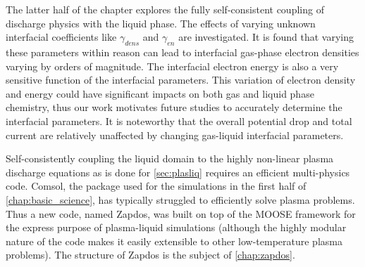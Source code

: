 The latter half of the chapter explores the fully self-consistent coupling of discharge physics with the liquid phase. The effects of varying unknown interfacial coefficients like $\gamma_{dens}$ and $\gamma_{en}$ are investigated. It is found that varying these parameters within reason can lead to interfacial gas-phase electron densities varying by orders of magnitude. The interfacial electron energy is also a very sensitive function of the interfacial parameters. This variation of electron density and energy could have significant impacts on both gas and liquid phase chemistry, thus our work motivates future studies to accurately determine the interfacial parameters. It is noteworthy that the overall potential drop and total current are relatively unaffected by changing gas-liquid interfacial parameters.

Self-consistently coupling the liquid domain to the highly non-linear plasma discharge equations as is done for \cref{sec:plasliq} requires an efficient multi-physics code. Comsol, the package used for the simulations in the first half of \cref{chap:basic_science}, has typically struggled to efficiently solve plasma problems. Thus a new code, named Zapdos, was built on top of the MOOSE framework for the express purpose of plasma-liquid simulations (although the highly modular nature of the code makes it easily extensible to other low-temperature plasma problems). The structure of Zapdos is the subject of \cref{chap:zapdos}.
